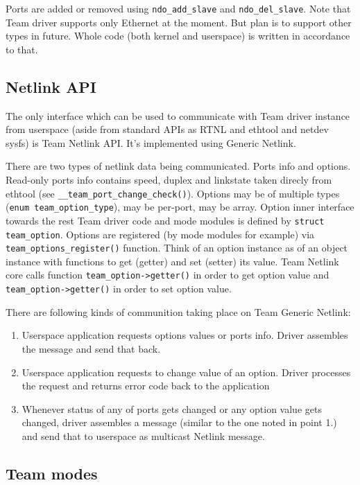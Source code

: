 \documentclass[11pt,a4paper]{article}
\begin{document}
Ports are added or removed using \verb+ndo_add_slave+ and \verb+ndo_del_slave+. Note that Team driver supports only Ethernet at the moment. But plan is to support other types in future. Whole code (both kernel and userspace) is written in accordance to that.

\subsection{Netlink API}

The only interface which can be used to communicate with Team driver instance from userspace (aside from standard APIs as RTNL and ethtool and netdev sysfs) is Team Netlink API. It's implemented using Generic Netlink.

There are two types of netlink data being communicated. Ports info and options. Read-only ports info contains speed, duplex and linkstate taken direcly from ethtool (see \verb+__team_port_change_check()+). Options may be of multiple types (\verb+enum team_option_type+), may be per-port, may be array. Option inner interface towards the rest Team driver code and mode modules is defined by \verb+struct team_option+. Options are registered (by mode modules for example) via \verb+team_options_register()+ function. Think of an option instance as of an object instance with functions to get (getter) and set (setter) its value. Team Netlink core calls function \verb+team_option->getter()+ in order to get option value and \verb+team_option->getter()+ in order to set option value.

There are following kinds of communition taking place on Team Generic Netlink:

\begin{enumerate}
\item Userspace application requests options values or ports info. Driver assembles the message and send that back.
\item Userspace application requests to change value of an option. Driver processes the request and returns error code back to the application
\item Whenever status of any of ports gets changed or any option value gets changed, driver assembles a message (similar to the one noted in point 1.) and send that to userspace as multicast Netlink message.
\end{enumerate}

\subsection{Team modes}
\end{document}
